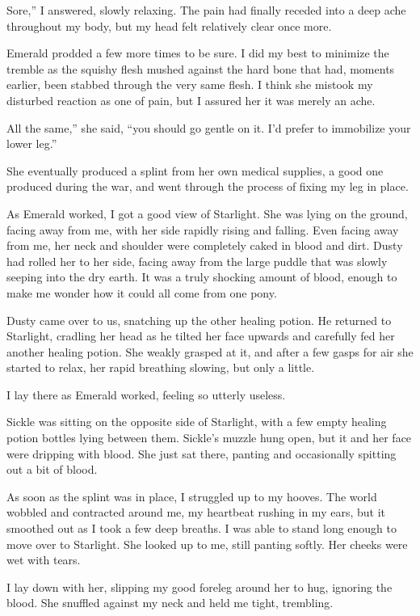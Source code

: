 \leavevmode{}Sore,” I answered, slowly relaxing. The pain had finally receded into a deep ache throughout my body, but my head felt relatively clear once more.

Emerald prodded a few more times to be sure. I did my best to minimize the tremble as the squishy flesh mushed against the hard bone that had, moments earlier, been stabbed through the very same flesh. I think she mistook my disturbed reaction as one of pain, but I assured her it was merely an ache.

\leavevmode{}All the same,” she said, “you should go gentle on it. I’d prefer to immobilize your lower leg.”

She eventually produced a splint from her own medical supplies, a good one produced during the war, and went through the process of fixing my leg in place.

As Emerald worked, I got a good view of Starlight. She was lying on the ground, facing away from me, with her side rapidly rising and falling. Even facing away from me, her neck and shoulder were completely caked in blood and dirt. Dusty had rolled her to her side, facing away from the large puddle that was slowly seeping into the dry earth. It was a truly shocking amount of blood, enough to make me wonder how it could all come from one pony.

Dusty came over to us, snatching up the other healing potion. He returned to Starlight, cradling her head as he tilted her face upwards and carefully fed her another healing potion. She weakly grasped at it, and after a few gasps for air she started to relax, her rapid breathing slowing, but only a little.

I lay there as Emerald worked, feeling so utterly useless.

Sickle was sitting on the opposite side of Starlight, with a few empty healing potion bottles lying between them. Sickle’s muzzle hung open, but it and her face were dripping with blood. She just sat there, panting and occasionally spitting out a bit of blood.

As soon as the splint was in place, I struggled up to my hooves. The world wobbled and contracted around me, my heartbeat rushing in my ears, but it smoothed out as I took a few deep breaths. I was able to stand long enough to move over to Starlight. She looked up to me, still panting softly. Her cheeks were wet with tears.

I lay down with her, slipping my good foreleg around her to hug, ignoring the blood. She snuffled against my neck and held me tight, trembling.

